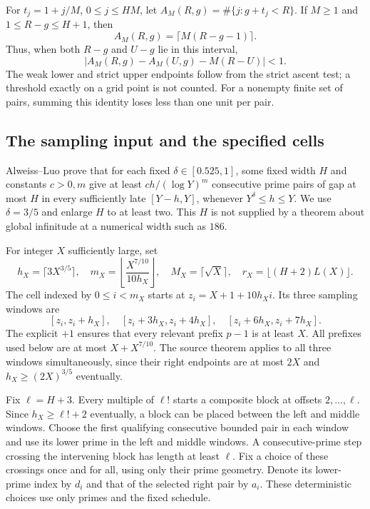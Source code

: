 \documentclass[11pt]{article}
\theoremstyle{definition}
\begin{document}
For $t_j=1+j/M$, $0\le j\le HM$, let
$A_M(R,g)=\#\{j:g+t_j<R\}$. If $M\ge1$ and
$1\le R-g\le H+1$, then
\[
 A_M(R,g)=\lceil M(R-g-1)\rceil.
\]
Thus, when both $R-g$ and $U-g$ lie in this interval,
\begin{equation}\label{eq:grid-rounding}
 |A_M(R,g)-A_M(U,g)-M(R-U)|<1.
\end{equation}
The weak lower and strict upper endpoints follow from the strict
ascent test; a threshold exactly on a grid point is not counted.
For a nonempty finite set of pairs, summing this identity loses
less than one unit per pair.

\subsection{The sampling input and the specified cells}
Alweiss--Luo \cite[Corollary~1.2]{AL} prove that for each fixed
$\delta\in[0.525,1]$, some fixed width $H$ and constants $c>0,m$
give at least $ch/(\log Y)^m$ consecutive prime pairs of gap at most
$H$ in every sufficiently late $[Y-h,Y]$, whenever
$Y^\delta\le h\le Y$. We use $\delta=3/5$ and enlarge $H$ to at
least two. This $H$ is not supplied by a theorem about global
infinitude at a numerical width such as $186$.

For integer $X$ sufficiently large, set
\[
 h_X=\lceil3X^{3/5}\rceil,\quad
 m_X=\left\lfloor\frac{X^{7/10}}{10h_X}\right\rfloor,\quad
 M_X=\lceil\sqrt X\rceil,\quad
 r_X=\lfloor(H+2)L(X)\rfloor.
\]
The cell indexed by $0\le i<m_X$ starts at
$z_i=X+1+10h_Xi$. Its three sampling windows are
\[
 [z_i,z_i+h_X],\quad
 [z_i+3h_X,z_i+4h_X],\quad
 [z_i+6h_X,z_i+7h_X].
\]
The explicit $+1$ ensures that every relevant prefix $p-1$ is at
least $X$. All prefixes used below are at most $X+X^{7/10}$.
The source theorem applies to all three windows simultaneously,
since their right endpoints are at most $2X$ and
$h_X\ge(2X)^{3/5}$ eventually.

Fix $\ell=H+3$. Every multiple of $\ell!$ starts a composite
block at offsets $2,\ldots,\ell$. Since $h_X\ge\ell!+2$
eventually, a block can be placed between the left and middle
windows. Choose the first qualifying consecutive bounded pair in each
window and use its lower prime in the left and middle windows.
A consecutive-prime step crossing the intervening block
has length at least $\ell$. Fix a choice of these crossings once
and for all, using only their prime geometry.
Denote its lower-prime index by $d_i$
and that of the selected right pair by $a_i$.
These deterministic choices use only primes and the fixed schedule.
\end{document}
